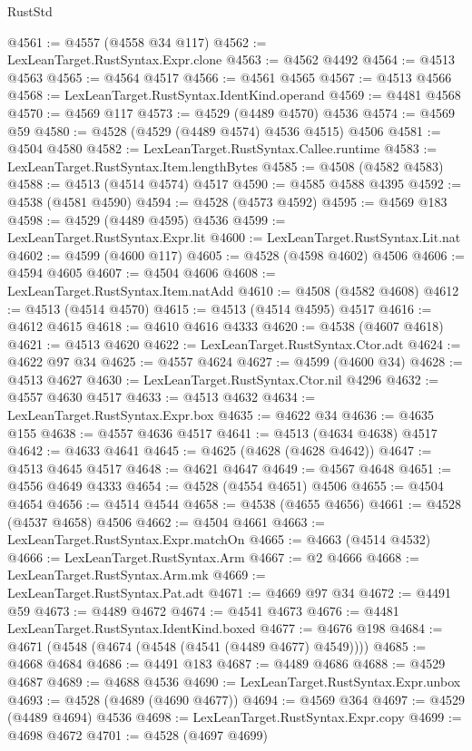 \begin{lexlean}{RustStd}
\begin{coremodule}
@4561 := @4557 (@4558 @34 @117)
@4562 := LexLeanTarget.RustSyntax.Expr.clone
@4563 := @4562 @4492
@4564 := @4513 @4563
@4565 := @4564 @4517
@4566 := @4561 @4565
@4567 := @4513 @4566
@4568 := LexLeanTarget.RustSyntax.IdentKind.operand
@4569 := @4481 @4568
@4570 := @4569 @117
@4573 := @4529 (@4489 @4570) @4536
@4574 := @4569 @59
@4580 := @4528 (@4529 (@4489 @4574) @4536 @4515) @4506
@4581 := @4504 @4580
@4582 := LexLeanTarget.RustSyntax.Callee.runtime
@4583 := LexLeanTarget.RustSyntax.Item.lengthBytes
@4585 := @4508 (@4582 @4583)
@4588 := @4513 (@4514 @4574) @4517
@4590 := @4585 @4588 @4395
@4592 := @4538 (@4581 @4590)
@4594 := @4528 (@4573 @4592)
@4595 := @4569 @183
@4598 := @4529 (@4489 @4595) @4536
@4599 := LexLeanTarget.RustSyntax.Expr.lit
@4600 := LexLeanTarget.RustSyntax.Lit.nat
@4602 := @4599 (@4600 @117)
@4605 := @4528 (@4598 @4602) @4506
@4606 := @4594 @4605
@4607 := @4504 @4606
@4608 := LexLeanTarget.RustSyntax.Item.natAdd
@4610 := @4508 (@4582 @4608)
@4612 := @4513 (@4514 @4570)
@4615 := @4513 (@4514 @4595) @4517
@4616 := @4612 @4615
@4618 := @4610 @4616 @4333
@4620 := @4538 (@4607 @4618)
@4621 := @4513 @4620
@4622 := LexLeanTarget.RustSyntax.Ctor.adt
@4624 := @4622 @97 @34
@4625 := @4557 @4624
@4627 := @4599 (@4600 @34)
@4628 := @4513 @4627
@4630 := LexLeanTarget.RustSyntax.Ctor.nil @4296
@4632 := @4557 @4630 @4517
@4633 := @4513 @4632
@4634 := LexLeanTarget.RustSyntax.Expr.box
@4635 := @4622 @34
@4636 := @4635 @155
@4638 := @4557 @4636 @4517
@4641 := @4513 (@4634 @4638) @4517
@4642 := @4633 @4641
@4645 := @4625 (@4628 (@4628 @4642))
@4647 := @4513 @4645 @4517
@4648 := @4621 @4647
@4649 := @4567 @4648
@4651 := @4556 @4649 @4333
@4654 := @4528 (@4554 @4651) @4506
@4655 := @4504 @4654
@4656 := @4514 @4544
@4658 := @4538 (@4655 @4656)
@4661 := @4528 (@4537 @4658) @4506
@4662 := @4504 @4661
@4663 := LexLeanTarget.RustSyntax.Expr.matchOn
@4665 := @4663 (@4514 @4532)
@4666 := LexLeanTarget.RustSyntax.Arm
@4667 := @2 @4666
@4668 := LexLeanTarget.RustSyntax.Arm.mk
@4669 := LexLeanTarget.RustSyntax.Pat.adt
@4671 := @4669 @97 @34
@4672 := @4491 @59
@4673 := @4489 @4672
@4674 := @4541 @4673
@4676 := @4481 LexLeanTarget.RustSyntax.IdentKind.boxed
@4677 := @4676 @198
@4684 := @4671 (@4548 (@4674 (@4548 (@4541 (@4489 @4677) @4549))))
@4685 := @4668 @4684
@4686 := @4491 @183
@4687 := @4489 @4686
@4688 := @4529 @4687
@4689 := @4688 @4536
@4690 := LexLeanTarget.RustSyntax.Expr.unbox
@4693 := @4528 (@4689 (@4690 @4677))
@4694 := @4569 @364
@4697 := @4529 (@4489 @4694) @4536
@4698 := LexLeanTarget.RustSyntax.Expr.copy
@4699 := @4698 @4672
@4701 := @4528 (@4697 @4699)

\end{coremodule}
\end{lexlean}
